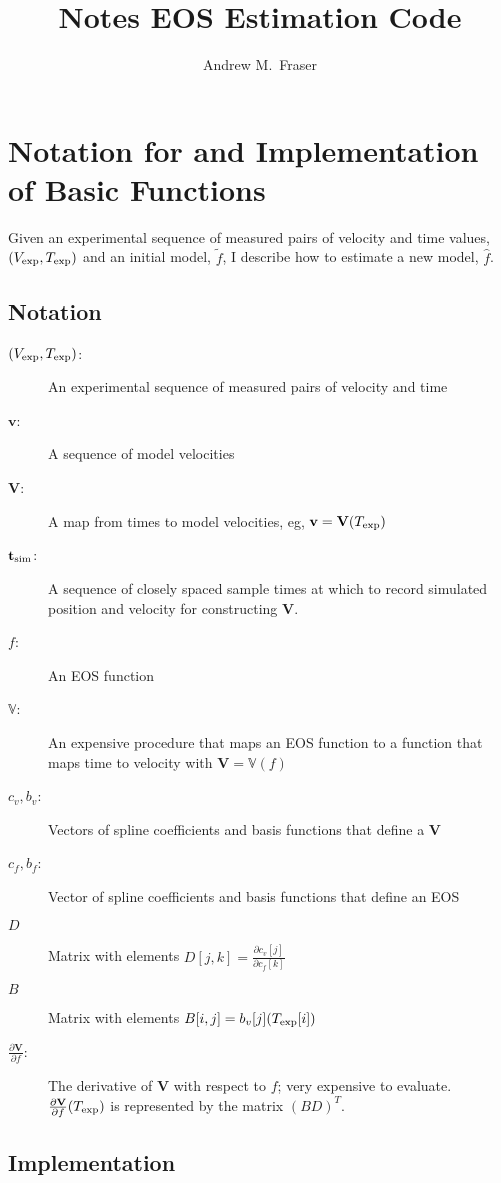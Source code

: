 \documentclass[12pt]{article}
\title{Notes EOS Estimation Code}
\author{Andrew M.\ Fraser}
\newcommand{\fnom}{\tilde f}
\newcommand{\fhat}{\hat f}
\newcommand{\partiald}[2]{\frac{\partial #1}{\partial #2}}
\newcommand\bv{\mathbf{v}}
\newcommand\Vfunc{\mathbb{V}}
\newcommand\Vt{\mathbf{V}}
\newcommand\vexp{V_{\rm{exp}}}
\newcommand\texp{T_{\rm{exp}}}
\newcommand\cf{c_f}
\newcommand\cv{c_v}
\newcommand\fbasis{b_f}
\newcommand\vbasis{b_v}
\newcommand\tsim{{\mathbf t}_{\rm{sim}}}
\newcommand\DVDf{\partiald{\Vt}{f}}
\begin{document}
\maketitle

\section{Notation for and Implementation of Basic Functions}
\label{sec:basic}


Given an experimental sequence of measured pairs of velocity and time
values, $(\vexp, \texp)$ and an initial model, $\fnom$, I describe how
to estimate a new model, $\fhat$.

\subsection{Notation}
\label{sec:basic_notation}

\begin{description}
\item[$(\vexp, \texp)$:] An experimental sequence of measured pairs of
  velocity and time
\item[$\bv$:] A sequence of model velocities
\item[$\Vt$:] A map from times to model velocities, eg, $\bv =
  \Vt(\texp)$
\item[$\tsim$:] A sequence of closely spaced sample times at which to record
  simulated position and velocity for constructing $\Vt$.
\item[$f$:] An EOS function
\item[$\Vfunc$:] An expensive procedure that maps an EOS function to a
  function that maps time to velocity with $\Vt = \Vfunc(f)$
\item[$\cv,\vbasis$:] Vectors of spline coefficients and basis functions
  that define a $\Vt$
\item[$\cf,\fbasis$:] Vector of spline coefficients and basis functions
  that define an EOS
\item[$D$] Matrix with elements $D[j,k] = \partiald{\cv[j]}{\cf[k]}$
\item[$B$] Matrix with elements $B[i,j] = \vbasis[j](\texp[i])$
\item[$\DVDf$:] The derivative of $\Vt$ with respect to $f$; very
  expensive to evaluate.  $\DVDf (\texp)$ is represented by the matrix
  $(BD)^T$.
\end{description}

\subsection{Implementation}
\label{sec:basic_implementation}
\end{document}
